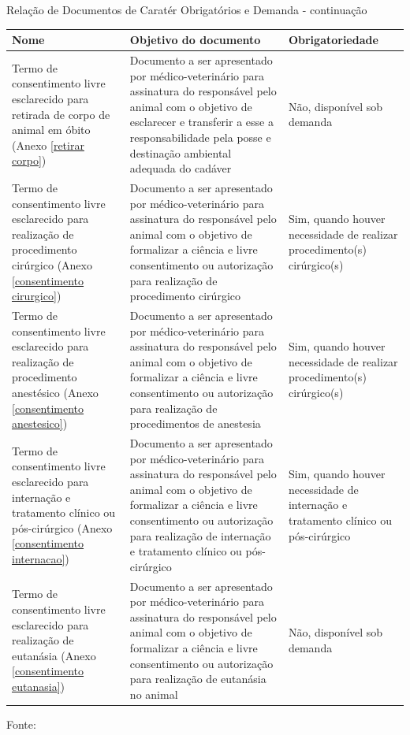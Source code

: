 \documentclass[
    12pt,               %
    openright,          %
    oneside,
    a4paper,            %
    BIBLATEX,           %
    TODO,               %
    english,            %
    brazil              %
    ]{ifsp-spo-inf-ctds}
\begin{document}
\begin{center}
    \begin{quadro}[H]
    \caption{Relação de Documentos de Caratér Obrigatórios e Demanda - continuação }
    \begin{tabulary}{1.0\textwidth}{|p{10em}|p{15em}|p{10em}|}
    \hline
    Nome & Objetivo do documento & Obrigatoriedade\\
    \hline    
    Termo de consentimento livre esclarecido para retirada de corpo de animal em óbito (Anexo \ref{retirar corpo}) & Documento a ser apresentado por médico-veterinário para assinatura do responsável pelo animal com o objetivo de esclarecer e transferir a esse a responsabilidade pela posse e destinação ambiental adequada do cadáver & Não, disponível sob demanda\\
    \hline
    Termo de consentimento livre esclarecido para realização de procedimento cirúrgico (Anexo \ref{consentimento cirurgico}) & Documento a ser apresentado por médico-veterinário para assinatura do responsável pelo animal com o objetivo de formalizar a ciência e livre consentimento ou autorização para realização de procedimento cirúrgico & Sim, quando houver necessidade de realizar procedimento(s) cirúrgico(s)\\
    \hline
    Termo de consentimento livre esclarecido para realização de procedimento anestésico (Anexo \ref{consentimento anestesico}) & Documento a ser apresentado por médico-veterinário para assinatura do responsável pelo animal com o objetivo de formalizar a ciência e livre consentimento ou autorização para realização de procedimentos de anestesia & Sim, quando houver necessidade de realizar procedimento(s) cirúrgico(s)\\
    \hline
    Termo de consentimento livre esclarecido para internação e tratamento clínico ou pós-cirúrgico (Anexo \ref{consentimento internacao}) & Documento a ser apresentado por médico-veterinário para assinatura do responsável pelo animal com o objetivo de formalizar a ciência e livre consentimento ou autorização para realização de internação e tratamento clínico ou pós-cirúrgico & Sim, quando houver necessidade de internação e tratamento clínico ou pós-cirúrgico\\
    \hline
    Termo de consentimento livre esclarecido para realização de eutanásia (Anexo \ref{consentimento eutanasia}) & Documento a ser apresentado por médico-veterinário para assinatura do responsável pelo animal com o objetivo de formalizar a ciência e livre consentimento ou autorização para realização de eutanásia no animal & Não, disponível sob demanda\\
    \hline
    \end{tabulary}   
    \label{doc_obrigatorio_demanda2}
    \centering
    \footnotesize {Fonte: }
    \end{quadro}
\end{center}
\end{document}
